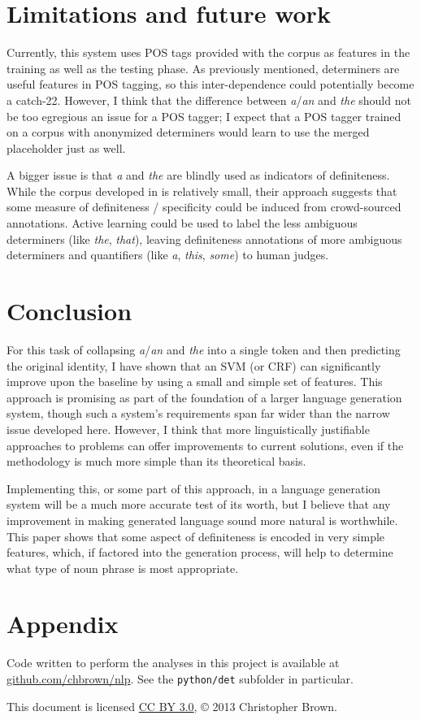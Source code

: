 \documentclass[11pt]{article}\usepackage{graphicx, color}
\begin{document}
\section{Limitations and future work}
Currently, this system uses POS tags provided with the corpus as features in the training as well as the testing phase. As previously mentioned, determiners are useful features in POS tagging, so this inter-dependence could potentially become a catch-22. However, I think that the difference between \emph{a}/\emph{an} and \emph{the} should not be too egregious an issue for a POS tagger; I expect that a POS tagger trained on a corpus with anonymized determiners would learn to use the merged placeholder \detplaceholder{} just as well.

A bigger issue is that \emph{a} and \emph{the} are blindly used as indicators of definiteness. While the corpus developed in \citet{vieira:2000} is relatively small, their approach suggests that some measure of definiteness / specificity could be induced from crowd-sourced annotations. Active learning could be used to label the less ambiguous determiners (like \emph{the}, \emph{that}), leaving definiteness annotations of more ambiguous determiners and quantifiers (like \emph{a}, \emph{this}, \emph{some}) to human judges.

\section{Conclusion}
For this task of collapsing \emph{a}/\emph{an} and \emph{the} into a single token and then predicting the original identity, I have shown that an SVM (or CRF) can significantly improve upon the baseline by using a small and simple set of features. This approach is promising as part of the foundation of a larger language generation system, though such a system's requirements span far wider than the narrow issue developed here. However, I think that more linguistically justifiable approaches to problems can offer improvements to current solutions, even if the methodology is much more simple than its theoretical basis.

Implementing this, or some part of this approach, in a language generation system will be a much more accurate test of its worth, but I believe that any improvement in making generated language sound more natural is worthwhile. This paper shows that some aspect of definiteness is encoded in very simple features, which, if factored into the generation process, will help to determine what type of noun phrase is most appropriate.



\section*{Appendix}

Code written to perform the analyses in this project is available at \href{https://github.com/chbrown/nlp}{github.com/chbrown/nlp}. See the \texttt{python/det} subfolder in particular.

This document is licensed \href{http://creativecommons.org/licenses/by/3.0/}{CC BY 3.0}, \copyright{} 2013 Christopher Brown.


\end{document}
